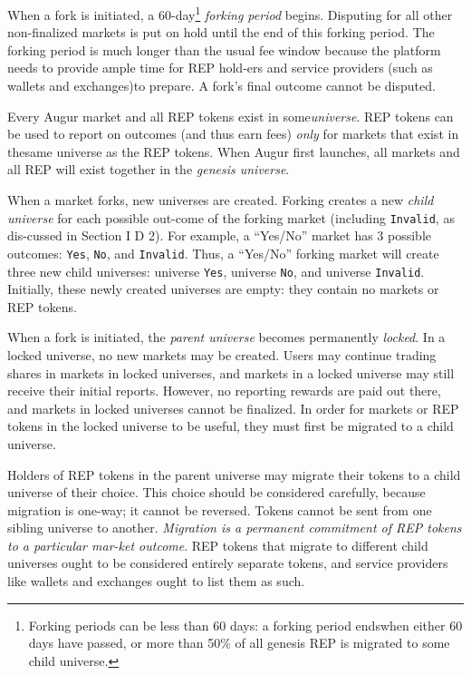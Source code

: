 \documentclass[12pt,floatfix,reprint,nofootinbib,amsmath,amssymb,epsfig,pre,floats,letterpaper,groupedaffiliation]{revtex4-1}
\theoremstyle{definition}
\theoremstyle{definition}
\begin{document}
When a fork is initiated, a 60-day\footnote{Forking periods can be less than 60 days: a forking period ends\linebreak when either 60 days have passed, or more than 50\% of all genesis REP is migrated to some child universe.} \textit{forking period} be\-gins. Disputing for all other non-finalized markets is put on hold until the end of this forking period. The forking period is much longer than the usual fee window because the platform needs to provide ample time for REP hold-\linebreak ers and service providers (such as wallets and exchanges)\linebreak to prepare. A fork's final outcome cannot be disputed.

Every Augur market and all REP tokens exist in some\linebreak \textit{universe}. REP tokens can be used to report on outcomes (and thus earn fees) \textit{only} for markets that exist in the\linebreak same universe as the REP tokens. When Augur first launches, all markets and all REP will exist together in the \textit{genesis universe}.

When a market forks, new universes are created. Forking creates a new \textit{child universe} for each possible out-\linebreak come of the forking market (including \texttt{Invalid}, as dis-\linebreak cussed in Section I D 2). For example, a ``Yes/No'' market has 3 possible outcomes: \texttt{Yes}, \texttt{No}, and \texttt{Invalid}. Thus, a ``Yes/No'' forking market will create three new child universes: universe \texttt{Yes}, universe \texttt{No}, and universe \texttt{Invalid}. Initially, these newly created universes are empty: they contain no markets or REP tokens.

When a fork is initiated, the \textit{parent universe} becomes permanently \textit{locked}. In a locked universe, no new markets may be created. Users may continue trading shares in markets in locked universes, and markets in a locked universe may still receive their initial reports. However, no reporting rewards are paid out there, and markets in locked universes cannot be finalized. In order for markets or REP tokens in the locked universe to be useful, they must first be migrated to a child universe.

Holders of REP tokens in the parent universe may migrate their tokens to a child universe of their choice. This choice should be considered carefully, because migration is one-way; it cannot be reversed. Tokens cannot be sent from one sibling universe to another. \textit{Migration is a permanent commitment of REP tokens to a particular mar-\linebreak ket outcome}. REP tokens that migrate to different child universes ought to be considered entirely separate tokens, and service providers like wallets and exchanges ought to list them as such.
\end{document}
